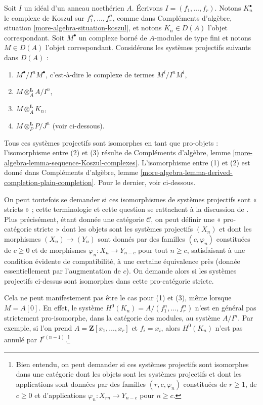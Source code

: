 \begin{remark}
\label{remark-strict-pro-isomorphism}
Soit $I$ un idéal d'un anneau noethérien $A$. Écrivons $I = (f_1, \ldots, f_r)$. Notons $K_n^\bullet$ le complexe de Koszul sur $f_1^n, \ldots, f_r^n$, comme dans Compléments d'algèbre, situation \ref{more-algebra-situation-koszul}, et notons $K_n \in D(A)$ l'objet correspondant. Soit $M^\bullet$ un complexe borné de $A$-modules de type fini et notons $M \in D(A)$ l'objet correspondant. Considérons les systèmes projectifs suivants dans $D(A)$ :

\begin{enumerate}
\item $M^\bullet/I^nM^\bullet$, c'est-à-dire le complexe de termes $M^i/I^nM^i$,
\item $M \otimes_A^\mathbf{L} A/I^n$,
\item $M \otimes_A^\mathbf{L} K_n$,
\item $M \otimes_P^\mathbf{L} P/J^n$ (voir ci-dessous).
\end{enumerate}
Tous ces systèmes projectifs sont isomorphes en tant que pro-objets : l'isomorphisme entre (2) et (3) résulte de Compléments d'algèbre, lemme \ref{more-algebra-lemma-sequence-Koszul-complexes}. L'isomorphisme entre (1) et (2) est donné dans Compléments d'algèbre, lemme \ref{more-algebra-lemma-derived-completion-plain-completion}. Pour le dernier, voir ci-dessous.

\medskip\noindent
On peut toutefois se demander si ces isomorphismes de systèmes projectifs sont « stricts » ; cette terminologie et cette question se rattachent à la discussion de \cite[pages 61, 62]{quillenhomology}. Plus précisément, étant donnée une catégorie $\mathcal{C}$, on peut définir une « pro-catégorie stricte » dont les objets sont les systèmes projectifs $(X_n)$ et dont les morphismes $(X_n) \to (Y_n)$ sont donnés par des familles $(c, \varphi_n)$ constituées de $c \geq 0$ et de morphismes $\varphi_n : X_n \to Y_{n - c}$ pour tout $n \geq c$, satisfaisant à une condition évidente de compatibilité, à une certaine équivalence près (donnée essentiellement par l'augmentation de $c$). On demande alors si les systèmes projectifs ci-dessus sont isomorphes dans cette pro-catégorie stricte.

\medskip\noindent
Cela ne peut manifestement pas être le cas pour (1) et (3), même lorsque $M = A[0]$. En effet, le système $H^0(K_n) = A/(f_1^n, \ldots, f_r^n)$ n'est en général pas strictement pro-isomorphe, dans la catégorie des modules, au système $A/I^n$. Par exemple, si l'on prend $A = \mathbf{Z}[x_1, \ldots, x_r]$ et $f_i = x_i$, alors $H^0(K_n)$ n'est pas annulé par $I^{r(n - 1)}$.\footnote{Bien entendu, on peut demander si ces systèmes projectifs sont isomorphes dans une catégorie dont les objets sont les systèmes projectifs et dont les applications sont données par des familles $(r, c, \varphi_n)$ constituées de $r \geq 1$, de $c \geq 0$ et d'applications $\varphi_n : X_{rn} \to Y_{n - c}$ pour $n \geq c$.}


\end{remark}
